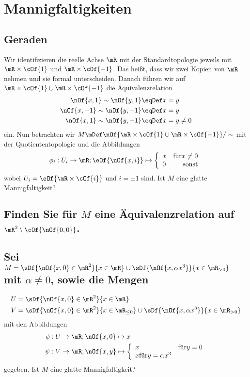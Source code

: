 \section{Mannigfaltigkeiten}
\subsection{Geraden}
Wir identifizieren die reelle Achse $\mR$ mit der Standardtopologie jeweils mit $\mR\times\cOf{1}$ und $\mR\times\cOf{-1}$. Das heißt, dass wir zwei Kopien von $\mR$ nehmen und sie formal unterscheiden. Danach führen wir auf $\mR\times\cOf{1}\cup\mR\times\cOf{-1}$ die Äquivalenzrelation
\begin{align}
	\nOf{x,1}\sim\nOf{y,1}&\eqDef x = y \\
	\nOf{x,-1}\sim\nOf{y,-1}&\eqDef x = y \\
	\nOf{x,1}\sim\nOf{y,-1}&\eqDef x = y \neq 0
\end{align}
ein. Nun betrachten wir $M\mDef\nOf{\mR\times\cOf{1}\cup\mR\times\cOf{-1}}/\sim$ mit der Quotiententopologie und die Abbildungen
\begin{equation}
	\phi_i : U_i \to \mR; \eOf{\nOf{x,i}} \mapsto \left\{\begin{array}{l r}x & \text{für} x \neq 0\\0&\text{sonst}\end{array}\right.
\end{equation}
wobei $U_i = \eOf{\mR\times\cOf{i}}$ und $i = \pm 1$ sind. Ist $M$ eine glatte Mannigfaltigkeit?


\subsection{Finden Sie für $M$ eine Äquivalenzrelation auf $\mR^2\setminus\cOf{\nOf{0,0}}$.}


\subsection{Sei $M = \sDf{\nOf{x,0}\in\mR^2}{x\in\mR}\cup\sDf{\nOf{x,\alpha x^3}}{x\in\mR_{>0}}$ mit $\alpha\neq 0$, sowie die Mengen}
\begin{align}
	U & = \sDf{\nOf{x,0}\in\mR^2}{x\in\mR} \\
	V & = \sDf{\nOf{x,0}\in\mR^2}{x\in\mR_{\leq 0}}\cup\sDf{\nOf{x,\alpha x^3}}{x\in\mR_{>0}}
\end{align}
mit den Abbildungen
\begin{align}
	\phi &: U \to \mR; \nOf{x,0} \mapsto x \\
	\psi &: V \to \mR; \nOf{x,y} \mapsto \left\{\begin{array}{l l}x & \text{für} y = 0\\x \text{für} y = \alpha x^3\end{array}\right.
\end{align}
gegeben. Ist $M$ eine glatte Mannigfaltigkeit?